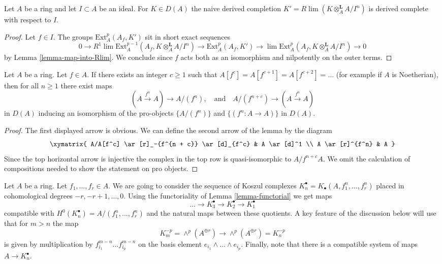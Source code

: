 \begin{lemma}
\label{lemma-naive-derived-completion}
Let $A$ be a ring and let $I \subset A$ be an ideal. For
$K \in D(A)$ the naive derived completion
$K' = R\lim (K \otimes_A^\mathbf{L} A/I^n)$
is derived complete with respect to $I$.
\end{lemma}

\begin{proof}
Let $f \in I$. The groups $\text{Ext}^p_A(A_f, K')$
sit in short exact sequences
$$
0 \to R^1\lim \text{Ext}^{p - 1}_A(A_f, K \otimes_A^\mathbf{L} A/I^n) \to
\text{Ext}^p_A(A_f, K') \to
\lim \text{Ext}^p_A(A_f, K \otimes_A^\mathbf{L} A/I^n) \to 0
$$
by Lemma \ref{lemma-map-into-Rlim}. We conclude since $f$ acts both
as an isomorphism and nilpotently on the outer terms.
\end{proof}

\begin{lemma}
\label{lemma-lift-universally}
Let $A$ be a ring. Let $f \in A$. If there exists an integer $c \geq 1$
such that $A[f^c] = A[f^{c + 1}] = A[f^{c + 2}] = \ldots$ (for example
if $A$ is Noetherian), then for all $n \geq 1$ there exist maps
$$
(A \xrightarrow{f^n} A) \longrightarrow A/(f^n),
\quad\text{and}\quad
A/(f^{n + c}) \longrightarrow (A \xrightarrow{f^n} A)
$$
in $D(A)$ inducing an isomorphism of the pro-objects $\{A/(f^n)\}$ and
$\{(f^n : A \to A)\}$ in $D(A)$.
\end{lemma}

\begin{proof}
The first displayed arrow is obvious. We can define the second arrow of
the lemma by the diagram
$$
\xymatrix{
A/A[f^c] \ar[r]_-{f^{n + c}} \ar[d]_{f^c} & A \ar[d]^1 \\
A \ar[r]^{f^n} & A
}
$$
Since the top horizontal arrow is injective the complex
in the top row is quasi-isomorphic to $A/f^{n + c}A$.
We omit the calculation of compositions needed to show
the statement on pro objects.
\end{proof}

\noindent
Let $A$ be a ring. Let $f_1, \ldots, f_r \in A$. We are going
to consider the sequence of Koszul complexes
$K_n^\bullet = K_\bullet(A, f_1^n, \ldots, f_r^n)$
placed in cohomological degrees $-r, -r + 1, \ldots, 0$.
Using the functoriality of Lemma \ref{lemma-functorial}
we get maps
$$
\ldots \to K_3^\bullet \to K_2^\bullet \to K_1^\bullet
$$
compatible with $H^0(K_n^\bullet) = A/(f_1^n, \ldots, f_r^n)$
and the natural maps between these quotients. A key feature of the
discussion below will use that for $m > n$ the map
$$
K_m^{-p} = \wedge^p(A^{\oplus r}) \to \wedge^p(A^{\oplus r}) = K_n^{-p}
$$
is given by multiplication by $f_{i_1}^{m - n} \ldots f_{i_p}^{m - n}$
on the basis element $e_{i_1} \wedge \ldots \wedge e_{i_p}$.
Finally, note that there is a compatible system of maps $A \to K_n^\bullet$.

